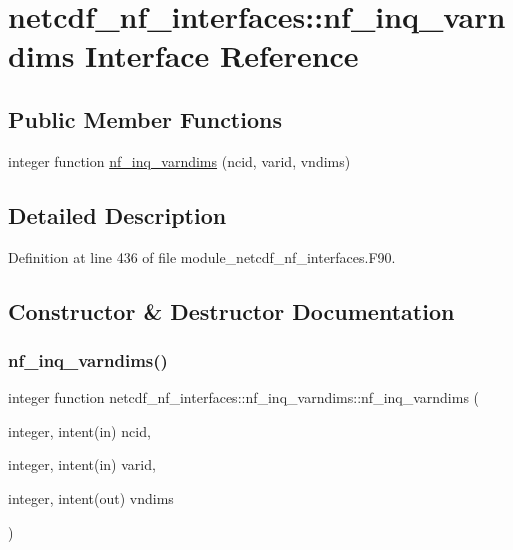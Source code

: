 \hypertarget{interfacenetcdf__nf__interfaces_1_1nf__inq__varndims}{}\section{netcdf\+\_\+nf\+\_\+interfaces\+:\+:nf\+\_\+inq\+\_\+varndims Interface Reference}
\label{interfacenetcdf__nf__interfaces_1_1nf__inq__varndims}
\subsection*{Public Member Functions}
\begin{DoxyCompactItemize}
\item 
integer function \hyperlink{interfacenetcdf__nf__interfaces_1_1nf__inq__varndims_ae482b0c161413215fa51875d622c9ae3}{nf\+\_\+inq\+\_\+varndims} (ncid, varid, vndims)
\end{DoxyCompactItemize}


\subsection{Detailed Description}


Definition at line 436 of file module\+\_\+netcdf\+\_\+nf\+\_\+interfaces.\+F90.



\subsection{Constructor \& Destructor Documentation}
\mbox{\label{interfacenetcdf__nf__interfaces_1_1nf__inq__varndims_ae482b0c161413215fa51875d622c9ae3}} 
\subsubsection{\texorpdfstring{nf\+\_\+inq\+\_\+varndims()}{nf\_inq\_varndims()}}
{\footnotesize\ttfamily integer function netcdf\+\_\+nf\+\_\+interfaces\+::nf\+\_\+inq\+\_\+varndims\+::nf\+\_\+inq\+\_\+varndims (\begin{DoxyParamCaption}\item[{integer, intent(in)}]{ncid,  }\item[{integer, intent(in)}]{varid,  }\item[{integer, intent(out)}]{vndims }\end{DoxyParamCaption})}



